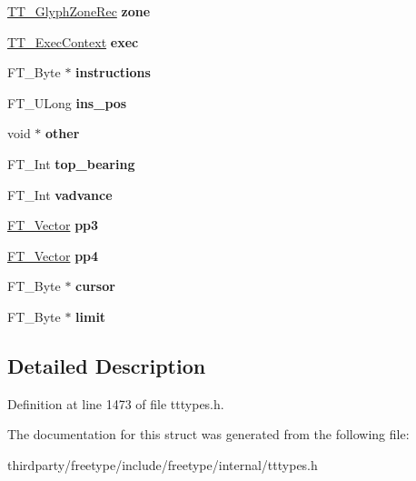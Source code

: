 \begin{DoxyCompactItemize}
\mbox{\label{struct_t_t___loader_rec___aaa594deb371418c6cb932f318a8631ce}} 
\hyperlink{struct_t_t___glyph_zone_rec__}{T\+T\+\_\+\+Glyph\+Zone\+Rec} {\bfseries zone}
\item 
\mbox{\label{struct_t_t___loader_rec___a22cae1f510e891a525092d33b373cc01}} 
\hyperlink{struct_t_t___exec_context_rec__}{T\+T\+\_\+\+Exec\+Context} {\bfseries exec}
\item 
\mbox{\label{struct_t_t___loader_rec___aaf1018107d5166a684604fde765b625a}} 
F\+T\+\_\+\+Byte $\ast$ {\bfseries instructions}
\item 
\mbox{\label{struct_t_t___loader_rec___a56c391d36a6391e8395cd09bc972b8b0}} 
F\+T\+\_\+\+U\+Long {\bfseries ins\+\_\+pos}
\item 
\mbox{\label{struct_t_t___loader_rec___a52009bf0f7ac51833b9fcba1b3bf0ffd}} 
void $\ast$ {\bfseries other}
\item 
\mbox{\label{struct_t_t___loader_rec___a00c9197ba5abd4e677f116423793a9f4}} 
F\+T\+\_\+\+Int {\bfseries top\+\_\+bearing}
\item 
\mbox{\label{struct_t_t___loader_rec___aec9d10cfbe0ced3fff990bb9e936e95d}} 
F\+T\+\_\+\+Int {\bfseries vadvance}
\item 
\mbox{\label{struct_t_t___loader_rec___a262052584bfb1ec7e6e801f71169093b}} 
\hyperlink{struct_f_t___vector__}{F\+T\+\_\+\+Vector} {\bfseries pp3}
\item 
\mbox{\label{struct_t_t___loader_rec___a0608203207c3fc735046b8baef4b9201}} 
\hyperlink{struct_f_t___vector__}{F\+T\+\_\+\+Vector} {\bfseries pp4}
\item 
\mbox{\label{struct_t_t___loader_rec___a6769a96f37ca22801f6199937cbe9ca7}} 
F\+T\+\_\+\+Byte $\ast$ {\bfseries cursor}
\item 
\mbox{\label{struct_t_t___loader_rec___a1b07761e8ea436c38b4c42117a00a0ff}} 
F\+T\+\_\+\+Byte $\ast$ {\bfseries limit}
\end{DoxyCompactItemize}


\subsection{Detailed Description}


Definition at line 1473 of file tttypes.\+h.



The documentation for this struct was generated from the following file\+:\begin{DoxyCompactItemize}
\item 
thirdparty/freetype/include/freetype/internal/tttypes.\+h\end{DoxyCompactItemize}
